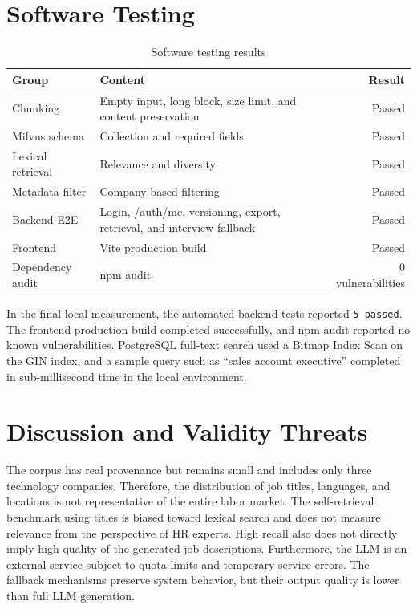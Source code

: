 \documentclass[12pt,a4paper,oneside]{report}
\newcommand{\code}[1]{\texttt{#1}}
\begin{document}
\section{Software Testing}
\begin{table}[H]
\centering
\caption{Software testing results}
\label{tab:test-result}
\begin{tabularx}{\textwidth}{p{4cm}Xr}
\toprule
\textbf{Group} & \textbf{Content} & \textbf{Result}\\
\midrule
Chunking & Empty input, long block, size limit, and content preservation & Passed\\
Milvus schema & Collection and required fields & Passed\\
Lexical retrieval & Relevance and diversity & Passed\\
Metadata filter & Company-based filtering & Passed\\
Backend E2E & Login, /auth/me, versioning, export, retrieval, and interview fallback & Passed\\
Frontend & Vite production build & Passed\\
Dependency audit & npm audit & 0 vulnerabilities\\
\bottomrule
\end{tabularx}
\end{table}

In the final local measurement, the automated backend tests reported \code{5 passed}. The frontend production build completed successfully, and npm audit reported no known vulnerabilities. PostgreSQL full-text search used a Bitmap Index Scan on the GIN index, and a sample query such as ``sales account executive'' completed in sub-millisecond time in the local environment.

\section{Discussion and Validity Threats}
The corpus has real provenance but remains small and includes only three technology companies. Therefore, the distribution of job titles, languages, and locations is not representative of the entire labor market. The self-retrieval benchmark using titles is biased toward lexical search and does not measure relevance from the perspective of HR experts. High recall also does not directly imply high quality of the generated job descriptions. Furthermore, the LLM is an external service subject to quota limits and temporary service errors. The fallback mechanisms preserve system behavior, but their output quality is lower than full LLM generation.
\end{document}
